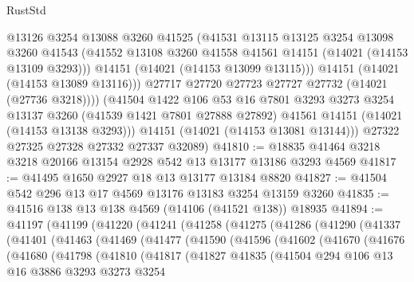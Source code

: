 \begin{lexlean}{RustStd}
\begin{coremodule}
              @13126
              @3254
              @13088
              @3260
              @41525
              (@41531
                @13115
                @13125
                @3254
                @13098
                @3260
                @41543
                (@41552 @13108 @3260 @41558 @41561 @14151 (@14021 (@14153 @13109 @3293)))
                @14151
                (@14021 (@14153 @13099 @13115)))
              @14151
              (@14021 (@14153 @13089 @13116)))
            @27717
            @27720
            @27723
            @27727
            @27732
            (@14021 (@27736 @3218))))
        (@41504
          @1422
          @106
          @53
          @16
          @7801
          @3293
          @3273
          @3254
          @13137
          @3260
          (@41539 @1421 @7801 @27888 @27892)
          @41561
          @14151
          (@14021 (@14153 @13138 @3293)))
        @14151
        (@14021 (@14153 @13081 @13144)))
      @27322
      @27325
      @27328
      @27332
      @27337
      @32089)
@41810 := @18835 @41464 @3218 @3218 @20166 @13154 @2928 @542 @13 @13177 @13186 @3293 @4569
@41817 := @41495 @1650 @2927 @18 @13 @13177 @13184 @8820
@41827 := @41504 @542 @296 @13 @17 @4569 @13176 @13183 @3254 @13159 @3260
@41835 := @41516 @138 @13 @138 @4569 (@14106 (@41521 @138)) @18935
@41894 := @41197
    (@41199
      (@41220
        (@41241
          (@41258
            (@41275
              (@41286
                (@41290
                  (@41337
                    (@41401
                      (@41463
                        (@41469
                          (@41477
                            (@41590
                              (@41596
                                (@41602
                                  (@41670
                                    (@41676
                                      (@41680
                                        (@41798
                                          (@41810
                                            (@41817
                                              (@41827
                                                @41835
                                                (@41504
                                                  @294
                                                  @106
                                                  @13
                                                  @16
                                                  @3886
                                                  @3293
                                                  @3273
                                                  @3254

\end{coremodule}
\end{lexlean}
